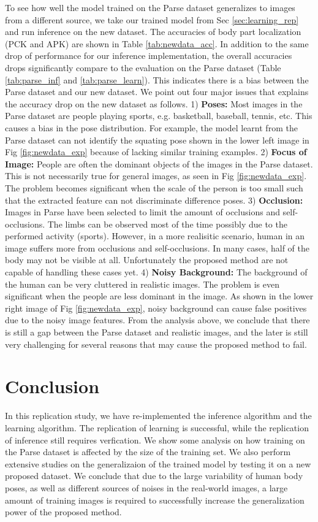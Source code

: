 \documentclass[10pt,twocolumn,letterpaper]{article}
\begin{document}
To see how well the model trained on the Parse dataset generalizes to images from a different source, we take our trained model from Sec \ref{sec:learning_rep} and run inference on the new dataset. The accuracies of body part localization (PCK and APK) are shown in Table \ref{tab:newdata_acc}. In addition to the same drop of performance for our inference implementation, the overall accuracies drops significantly compare to the evaluation on the Parse dataset (Table \ref{tab:parse_inf} and \ref{tab:parse_learn}). This indicates there is a bias between the Parse dataset and our new dataset. We point out four major issues that explains the accuracy drop on the new dataset as follows. 1) {\bf Poses:} Most images in the Parse dataset are people playing sports, e.g. basketball, baseball, tennis, etc. This causes a bias in the pose distribution. For example, the model learnt from the Parse dataset can not identify the squating pose shown in the lower left image in Fig \ref{fig:newdata_exp} because of lacking similar training examples. 2) {\bf Focus of Image:} People are often the dominant objects of the images in the Parse dataset. This is not necessarily true for general images, as seen in Fig \ref{fig:newdata_exp}. The problem becomes significant when the scale of the person is too small such that the extracted feature can not discriminate difference poses. 3) {\bf Occlusion:} Images in Parse have been selected to limit the amount of occlusions and self-occlusions. The limbs can be observed most of the time possibly due to the performed activity (sports). However, in a more realisitic scenario, human in an image suffers more from occlusions and self-occlusions. In many cases, half of the body may not be visible at all. Unfortunately the proposed method are not capable of handling these cases yet. 4) {\bf Noisy Background:} The background of the human can be very cluttered in realistic images. The problem is even significant when the people are less dominant in the image. As shown in the lower right image of Fig \ref{fig:newdata_exp}, noisy background can cause false positives due to the noisy image features. From the analysis above, we conclude that there is still a gap between the Parse dataset and realistic images, and the later is still very challenging for several reasons that may cause the proposed method to fail.

\section{Conclusion}
In this replication study, we have re-implemented the inference algorithm and the learning algorithm. The replication of learning is successful, while the replication of inference still requires verfication. We show some analysis on how training on the Parse dataset is affected by the size of the training set. We also perform extensive studies on the generalizaion of the trained model by testing it on a new proposed dataset. We conclude that due to the large variability of human body poses, as well as different sources of noises in the real-world images, a large amount of training images is required to successfully increase the generalization power of the proposed method.
\end{document}
